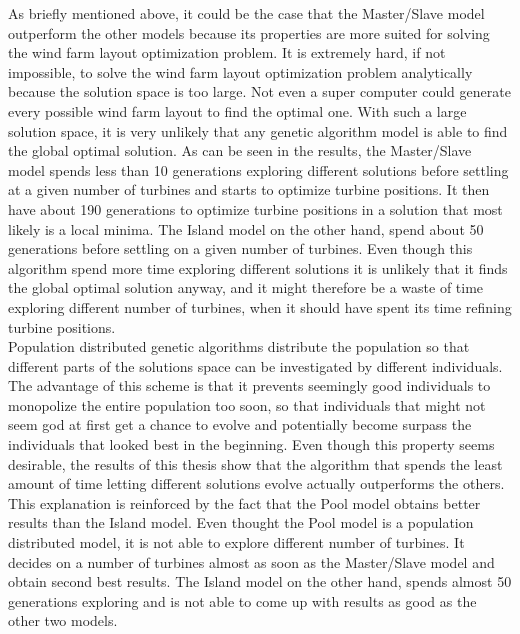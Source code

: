 \noindent As briefly mentioned above, it could be the case that the Master/Slave model outperform the other models because its properties are more suited for solving the wind farm layout optimization problem. It is extremely hard, if not impossible, to solve the wind farm layout optimization problem analytically because the solution space is too large. Not even a super computer could generate every possible wind farm layout to find the optimal one. With such a large solution space, it is very unlikely that any genetic algorithm model is able to find the global optimal solution. As can be seen in the results, the Master/Slave model spends less than 10 generations exploring different solutions before settling at a given number of turbines and starts to optimize turbine positions. It then have about 190 generations to optimize turbine positions in a solution that most likely is a local minima. The Island model on the other hand, spend about 50 generations before settling on a given number of turbines. Even though this algorithm spend more time exploring different solutions it is unlikely that it finds the global optimal solution anyway, and it might therefore be a waste of time exploring different number of turbines, when it should have spent its time refining turbine positions.\\

\noindent Population distributed genetic algorithms distribute the population so that different parts of the solutions space can be investigated by different individuals. The advantage of this scheme is that it prevents seemingly good individuals to monopolize the entire population too soon, so that individuals that might not seem god at first get a chance to evolve and potentially become surpass the individuals that looked best in the beginning. Even though this property seems desirable, the results of this thesis show that the algorithm that spends the least amount of time letting different solutions evolve actually outperforms the others. This explanation is reinforced by the fact that the Pool model obtains better results than the Island model. Even thought the Pool model is a population distributed model, it is not able to explore different number of turbines. It decides on a number of turbines almost as soon as the Master/Slave model and obtain second best results. The Island model on the other hand, spends almost 50 generations exploring and is not able to come up with results as good as the other two models.\\

